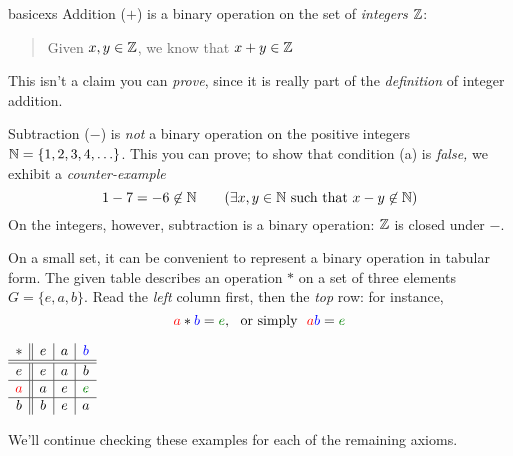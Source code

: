 \begin{examples}{}{basicexs}
	\exstart Addition ($+$) is a binary operation on the set of \emph{integers} $\mathbb{Z}$:\vspace{-2pt}
	\begin{enumerate}\setcounter{enumi}{1}
		\item[]\begin{quote}
			Given $x,y\in\mathbb{Z}$, we know that $x+y\in\mathbb{Z}$
		\end{quote}
		\smallskip
		This isn't a claim you can \emph{prove}, since it is really part of the \emph{definition} of integer addition.

	  \item Subtraction ($-$) is \emph{not} a binary operation on the positive integers $\mathbb{N}=\{1,2,3,4,\ldots\}$. This you can prove; to show that condition (a) is \emph{false,} we exhibit a \emph{counter-example}
	  \[
	  	1-7=-6\not\in\N\tag{$\exists x,y\in\N$ such that $x-y\not\in\N$}
	  \]
	  On the integers, however, subtraction is a binary operation: $\mathbb{Z}$ is closed under $-$.
  
	 	\begin{minipage}[t]{0.8\linewidth}\vspace{0pt}
		  \item\label{ex:table1} On a small set, it can be convenient to represent a binary operation in tabular form. The given table describes an operation $*$ on a set of three elements $G=\{e,a,b\}$. Read the  \emph{left} column first, then the \emph{top} row: for instance,
		  \[
		  	\textcolor{red}{a}*\textcolor{blue}{b}=\textcolor{Green}{e},
		  	\ \text{ or simply }\
		  	\textcolor{red}{a}\textcolor{blue}{b}=\textcolor{Green}{e}
		  \]
		\end{minipage}
		\hfill
		\begin{minipage}[t]{0.15\linewidth}\vspace{0pt}
			\flushright
			$\begin{array}{c||c|c|c}
				* & e & a & \textcolor{blue}{b}\\\hline\hline
				e & e & a & b\\\hline
				\textcolor{red}{a} & a & e & \textcolor{Green}{e}\\\hline
				b & b & e & a
			\end{array}$
		\end{minipage}
	\end{enumerate}
\end{examples}


We'll continue checking these examples for each of the remaining axioms.


